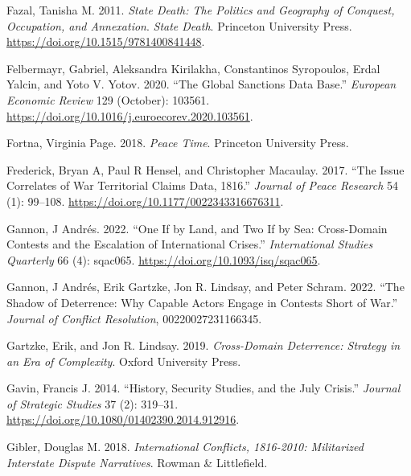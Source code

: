 \documentclass{article}
\newlength{\cslhangindent}
\newlength{\cslentryspacingunit} %
\newenvironment{CSLReferences}[2] %
 {%
  \setlength{\parindent}{0pt}
  \ifodd #1
  \let\oldpar\par
  \def\par{\hangindent=\cslhangindent\oldpar}
  \fi
  \setlength{\parskip}{#2\cslentryspacingunit}
 }%
 {}
\begin{document}
\begin{CSLReferences}{1}{0}
\leavevmode{}%
Fazal, Tanisha M. 2011. \emph{State {Death}: {The Politics} and
{Geography} of {Conquest}, {Occupation}, and {Annexation}}. \emph{State
Death}. {Princeton University Press}.
\url{https://doi.org/10.1515/9781400841448}.

\leavevmode{}%
Felbermayr, Gabriel, Aleksandra Kirilakha, Constantinos Syropoulos,
Erdal Yalcin, and Yoto V. Yotov. 2020. {``The Global Sanctions Data
Base.''} \emph{European Economic Review} 129 (October): 103561.
\url{https://doi.org/10.1016/j.euroecorev.2020.103561}.

\leavevmode{}%
Fortna, Virginia Page. 2018. \emph{Peace Time}. {Princeton University
Press}.

\leavevmode{}%
Frederick, Bryan A, Paul R Hensel, and Christopher Macaulay. 2017.
{``The {Issue Correlates} of {War Territorial Claims Data},
1816.''} \emph{Journal of Peace Research} 54 (1):
99--108. \url{https://doi.org/10.1177/0022343316676311}.

\leavevmode{}%
Gannon, J Andrés. 2022. {``One If by {Land}, and {Two} If by {Sea}:
{Cross-Domain Contests} and the {Escalation} of {International
Crises}.''} \emph{International Studies Quarterly} 66 (4): sqac065.
\url{https://doi.org/10.1093/isq/sqac065}.

\leavevmode{}%
Gannon, J Andrés, Erik Gartzke, Jon R. Lindsay, and Peter Schram. 2022.
{``The {Shadow} of {Deterrence}: {Why Capable Actors Engage} in
{Contests Short} of {War}.''} \emph{Journal of Conflict Resolution},
00220027231166345.

\leavevmode{}%
Gartzke, Erik, and Jon R. Lindsay. 2019. \emph{Cross-{Domain
Deterrence}: {Strategy} in an {Era} of {Complexity}}. {Oxford University
Press}.

\leavevmode{}%
Gavin, Francis J. 2014. {``History, {Security Studies}, and the {July
Crisis}.''} \emph{Journal of Strategic Studies} 37 (2): 319--31.
\url{https://doi.org/10.1080/01402390.2014.912916}.

\leavevmode{}%
Gibler, Douglas M. 2018. \emph{International {Conflicts}, 1816-2010:
{Militarized Interstate Dispute Narratives}}. {Rowman \& Littlefield}.


\end{CSLReferences}
\end{document}
